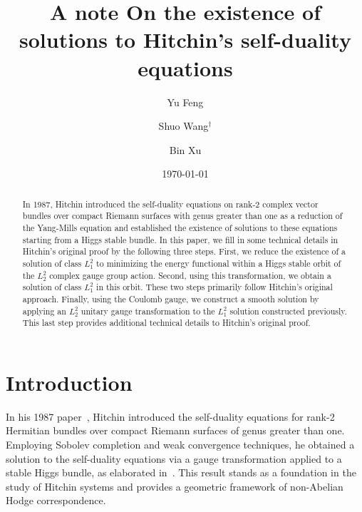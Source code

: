 \documentclass[a4paper]{amsart}
\title{A note On the existence of solutions to Hitchin's self-duality equations}
\date{\today}
\author{Yu Feng }
\author{Shuo Wang$^\dagger$}
\author{Bin Xu}
\theoremstyle{definition}
\theoremstyle{remark}
\numberwithin{equation}{section}
\begin{document}
\maketitle

\begin{abstract}
In 1987, Hitchin introduced the self-duality equations on rank-2 complex vector bundles over compact Riemann surfaces with genus greater than one as a reduction of the Yang-Mills equation and established the existence of solutions to these equations starting from a Higgs stable bundle. In this paper, we fill in some technical details in Hitchin's original proof by the following three steps. First, we reduce the existence of a solution of class $L_1^2$ to minimizing the energy functional within a Higgs stable orbit of the $L_2^2$ complex gauge group action. Second, using this transformation, we obtain a solution of class $L_1^2$ in this orbit. These two steps primarily follow Hitchin's original approach. Finally, using the Coulomb gauge, we construct a smooth solution by applying an $L_2^2$ unitary gauge  transformation to the $L_1^2$ solution constructed previously. This last step provides additional technical details to Hitchin's original proof.
\end{abstract}


\section{Introduction}

In his 1987 paper~\cite{hitchin1987self}, Hitchin introduced the self-duality equations for rank-2 Hermitian bundles over compact Riemann surfaces of genus greater than one. Employing Sobolev completion and weak convergence techniques, he obtained a solution to the self-duality equations via a gauge transformation applied to a stable Higgs bundle, as elaborated in~\cite[Theorem 4.3]{hitchin1987self}. This result stands as a foundation in the study of Hitchin systems and provides a geometric framework of non-Abelian Hodge correspondence.
\end{document}
